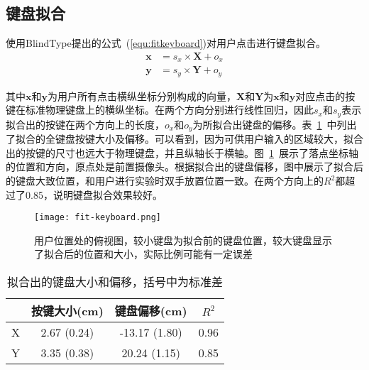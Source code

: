 \subsection{键盘拟合}
使用BlindType\cite{2017blindtype}提出的公式~(\ref{equ:fitkeyboard})对用户点击进行键盘拟合。
\begin{equation}
  \label{equ:fitkeyboard}
  \begin{aligned}
  \textbf{x} &= s_{x} \times \textbf{X} + o_{x} \\
  \textbf{y} &= s_{y} \times \textbf{Y} + o_{y}
  \end{aligned}
\end{equation}

其中$\textbf{x}$和$\textbf{y}$为用户所有点击横纵坐标分别构成的向量，$\textbf{X}$和$\textbf{Y}$为$\textbf{x}$和$\textbf{y}$对应点击的按键在标准物理键盘上的横纵坐标。在两个方向分别进行线性回归，因此$s_{x}$和$s_{y}$表示拟合出的按键在两个方向上的长度，$o_{x}$和$o_{y}$为所拟合出键盘的偏移。表~\ref{tab:fitkeyboard}~中列出了拟合的全键盘按键大小及偏移。可以看到，因为可供用户输入的区域较大，拟合出的按键的尺寸也远大于物理键盘，并且纵轴长于横轴。图~\ref{fig:fitkeyboard}~展示了落点坐标轴的位置和方向，原点处是前置摄像头。根据拟合出的键盘偏移，图中展示了拟合后的键盘大致位置，和用户进行实验时双手放置位置一致。在两个方向上的$R^{2}$都超过了0.85，说明键盘拟合效果较好。

\begin{figure}[h] %
  \centering
  \texttt{[image: fit-keyboard.png]}
  \caption{用户位置处的俯视图，较小键盘为拟合前的键盘位置，较大键盘显示了拟合后的位置和大小，实际比例可能有一定误差}
  \label{fig:fitkeyboard}
\end{figure}

\begin{table}[htb]
  \centering
  \begin{minipage}[t]{0.55\linewidth} %
  \caption[拟合出的键盘参数]{拟合出的键盘大小和偏移，括号中为标准差}
  \label{tab:fitkeyboard}
    \centering
    \begin{tabularx}{\linewidth}{cccc}
      \toprule[1.5pt]
      & 按键大小(cm) & 键盘偏移(cm) & $R^{2}$ \\\midrule[1pt]
      X & 2.67 (0.24) & -13.17 (1.80) & 0.96 \\
      Y & 3.35 (0.38) & 20.24 (1.15) & 0.85\\
      \bottomrule[1.5pt]
    \end{tabularx}
  \end{minipage}
\end{table}


